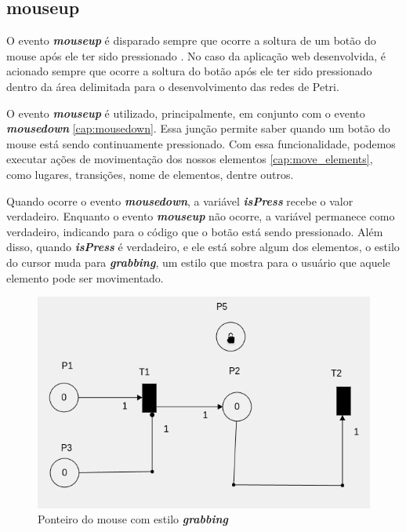\documentclass[
	12pt,				%
	openright,			%
	oneside,			%
	a4paper,			%
	english,			%
	brazil				%
	]{abntex2}
\begin{document}
\subsection*{mouseup}\label{cap:mouseup}

O evento \textbf{\textit{mouseup}} é disparado sempre que ocorre a soltura de um botão do mouse após ele ter sido pressionado \cite{mdn_mouseup_event}. No caso da aplicação web desenvolvida, é acionado sempre que ocorre a soltura do botão após ele ter sido pressionado dentro da área delimitada para o desenvolvimento das redes de Petri.



O evento \textbf{\textit{mouseup}} é utilizado, principalmente, em conjunto com o evento \textbf{\textit{mousedown}} \ref{cap:mousedown}. Essa junção permite saber quando um botão do mouse está sendo continuamente pressionado. Com essa funcionalidade, podemos executar ações de movimentação dos nossos elementos \ref{cap:move_elements}, como lugares, transições, nome de elementos, dentre outros. 



Quando ocorre o evento \textbf{\textit{mousedown}}, a variável \textbf{\textit{isPress}} recebe o valor verdadeiro. Enquanto o evento \textbf{\textit{mouseup}} não ocorre, a variável permanece como verdadeiro, indicando para o código que o botão está sendo pressionado. Além disso, quando \textbf{\textit{isPress}} é verdadeiro, e ele está sobre algum dos elementos, o estilo do cursor muda para \textbf{\textit{grabbing}}, um estilo que mostra para o usuário que aquele elemento pode ser movimentado. 

\begin{figure}[ht] 
	\centering
	\includegraphics[scale=0.4]{figuras/mouse_estilo_grabbing.png}
	\caption[Mouse estilo grabbing]{Ponteiro do mouse com estilo \textbf{\textit{grabbing}}}
	\label{fig:mouse_estilo_grabbing}
\end{figure}
\FloatBarrier
\end{document}
